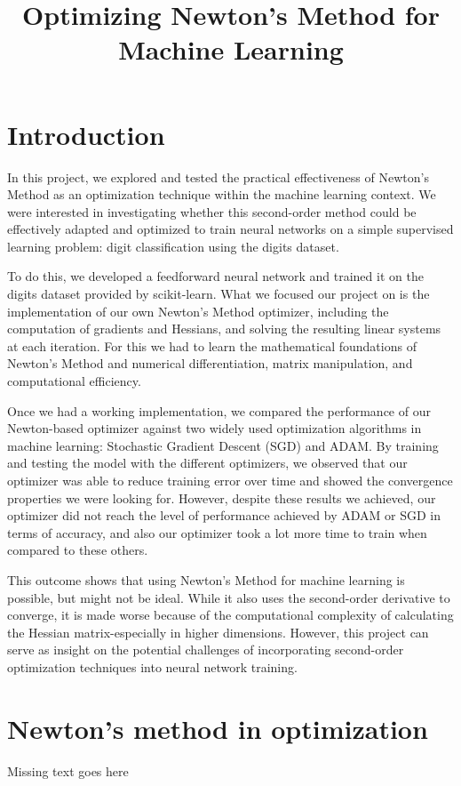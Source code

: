 \documentclass[10pt]{article}
\title{Optimizing Newton's Method for Machine Learning }
\author{}
\date{}
\begin{document}
\maketitle
\section*{Introduction}
In this project, we explored and tested the practical effectiveness of Newton's Method as an optimization technique within the machine learning context. We were interested in investigating whether this second-order method could be effectively adapted and optimized to train neural networks on a simple supervised learning problem: digit classification using the digits dataset.

To do this, we developed a feedforward neural network and trained it on the digits dataset provided by scikit-learn. What we focused our project on is the implementation of our own Newton's Method optimizer, including the computation of gradients and Hessians, and solving the resulting linear systems at each iteration. For this we had to learn the mathematical foundations of Newton's Method and numerical differentiation, matrix manipulation, and computational efficiency.

Once we had a working implementation, we compared the performance of our Newton-based optimizer against two widely used optimization algorithms in machine learning: Stochastic Gradient Descent (SGD) and ADAM. By training and testing the model with the different optimizers, we observed that our optimizer was able to reduce training error over time and showed the convergence properties we were looking for. However, despite these results we achieved, our optimizer did not reach the level of performance achieved by ADAM or SGD in terms of accuracy, and also our optimizer took a lot more time to train when compared to these others.

This outcome shows that using Newton's Method for machine learning is possible, but might not be ideal. While it also uses the second-order derivative to converge, it is made worse because of the computational complexity of calculating the Hessian matrix-especially in higher dimensions. However, this project can serve as insight on the potential challenges of incorporating second-order optimization techniques into neural network training.

\section*{Newton's method in optimization}
Missing text goes here
\end{document}
